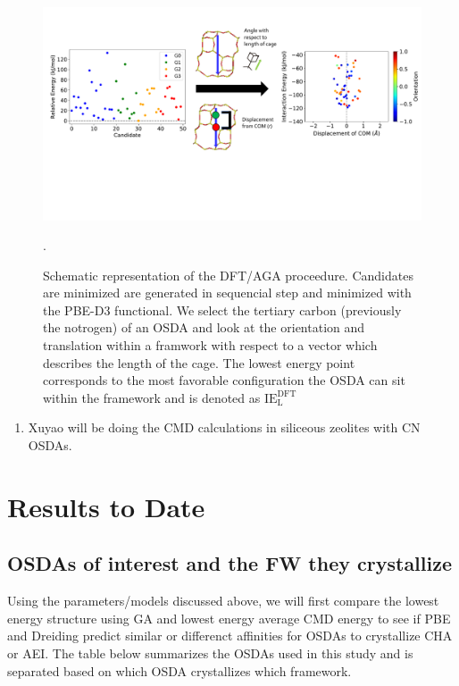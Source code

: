 \documentclass[journal=accacs,manuscript=article, email=true, layout=traditional]{achemso}
\begin{document}
\begin{figure}
\begin{center}

\includegraphics[scale=.5,trim={0cm 5cm 0cm 0cm},clip]{./Figures/DFT_GA_to_Ori.pdf}
\caption{Schematic representation of the DFT/AGA proceedure. Candidates are minimized are generated in sequencial step and minimized with the PBE-D3 functional. We select the tertiary carbon (previously the notrogen) of an OSDA and look at the orientation and translation within a framwork with respect to a vector which describes the length of the cage. The lowest energy point corresponds to the most favorable configuration the OSDA can sit within the framework and is denoted as $\text{IE}^{\text{DFT}}_{\text{L}}$}. 
\label{fig:DFT_GA_to_Ori} 

\end{center}
\end{figure}

\begin{enumerate}
\item Xuyao will be doing the CMD calculations in siliceous zeolites with CN OSDAs.
\end{enumerate}






\section{Results to Date}
\label{sec:org9931970}
\subsection{OSDAs of interest and the FW they crystallize}
\label{sec:org95c7882}
Using the parameters/models discussed above, we will first compare the lowest energy structure using GA and lowest energy average CMD energy to see if PBE and Dreiding predict similar or differenct affinities for OSDAs to crystallize CHA or AEI. The table below summarizes the OSDAs used in this study and is separated based on which OSDA crystallizes which framework. 
\end{document}
